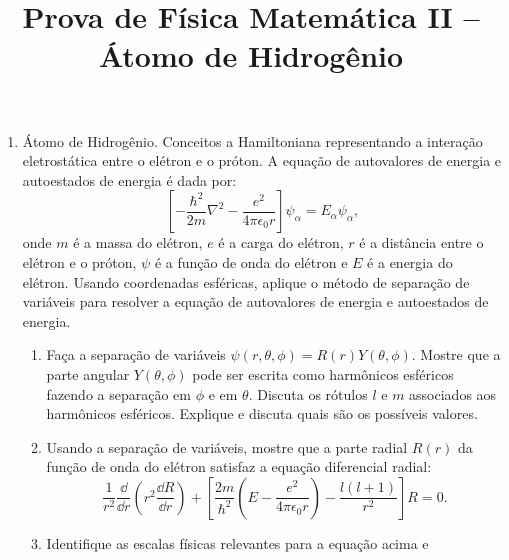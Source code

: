 \newif\ifuseseminar
\useseminartrue


\title{Prova de Física Matemática II -- Átomo de Hidrogênio}


\begin{enumerate}
      \item Átomo de Hidrogênio. Conceitos a Hamiltoniana representando a interação
            eletrostática entre o elétron e o próton. A equação de autovalores de
            energia e autoestados de energia é dada por:
            \begin{equation}
                  \left[ -\frac{\hbar^2}{2m} \nabla^2 - \frac{e^2}{4\pi\epsilon_0r} \right]
                  \psi_\alpha = E_\alpha \psi_\alpha,
            \end{equation}
            onde $m$ é a massa do elétron, $e$ é a carga do elétron, $r$ é a distância
            entre o elétron e o próton, $\psi$ é a função de onda do elétron e $E$ é a
            energia do elétron. Usando coordenadas esféricas, aplique o método de
            separação de variáveis para resolver a equação de autovalores de energia e
            autoestados de energia.
            \begin{enumerate}
                  \item Faça a separação de variáveis $\psi(r,\theta,\phi) =
                              R(r)Y(\theta,\phi)$. Mostre que a parte angular
                        $Y(\theta,\phi)$ pode ser escrita como harmônicos
                        esféricos fazendo a separação em $\phi$ e em $\theta$.
                        Discuta os rótulos $l$ e $m$ associados aos harmônicos
                        esféricos. Explique e discuta quais são os possíveis
                        valores.
                  \item Usando a separação de variáveis, mostre que a parte radial
                        $R(r)$ da função de onda do elétron satisfaz a equação
                        diferencial radial:
                        \begin{equation}
                              \frac{1}{r^2} \frac{\dd}{\dd r} \left( r^2 \frac{\dd R}{\dd r} \right) +
                              \left[ \frac{2m}{\hbar^2} \left( E - \frac{e^2}{4\pi\epsilon_0r} \right) -
                                    \frac{l(l+1)}{r^2} \right] R = 0.
                        \end{equation}
                  \item Identifique as escalas físicas relevantes para a equação acima e

\end{enumerate}
\end{enumerate}
